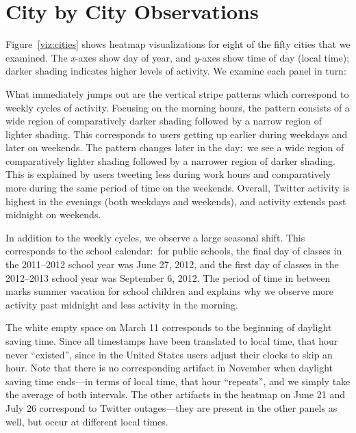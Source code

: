 \documentclass[letterpaper]{article}
\begin{document}
\section{City by City Observations}

Figure~\ref{viz:cities} shows heatmap visualizations for eight of the
fifty cities that we examined. The {\it x}-axes show day of year, and
{\it y}-axes show time of day (local time); darker shading indicates higher levels
of activity. We examine each panel in turn:

\smallskip {} What immediately jumps out
are the vertical stripe patterns which correspond to weekly cycles of
activity. Focusing on the morning hours, the pattern consists of a
wide region of comparatively darker shading followed by a narrow
region of lighter shading. This corresponds to users getting up earlier
during weekdays and later on weekends. The pattern changes later in
the day:\ we see a wide region of comparatively lighter shading followed by a
narrower region of darker shading. This is explained by users tweeting
less during work hours and comparatively more during the same period
of time on the weekends. Overall, Twitter activity is highest in the
evenings (both weekdays and weekends), and activity extends past
midnight on weekends.

In addition to the weekly cycles, we observe a
large seasonal shift. This corresponds to the school
calendar:\ for public schools, the final day of classes in the 2011--2012
school year was June 27, 2012, and the first day of classes in the
2012--2013 school year was September 6, 2012. The period of time in between marks
summer vacation for school children and
explains why we observe more activity past midnight and less activity
in the morning.


The white empty space on March 11 corresponds to the beginning of
daylight saving time. Since all timestamps have been translated to
local time, that hour never ``existed'', since in the United States
users adjust their clocks to skip an hour. Note that there is no
corresponding artifact in November when daylight saving time ends---in
terms of local time, that hour ``repeats'', and we simply take the
average of both intervals. The other artifacts in the heatmap on June 21 and July
26 correspond to Twitter outages---they are present in the other panels as
well, but occur at different local times.
\end{document}

